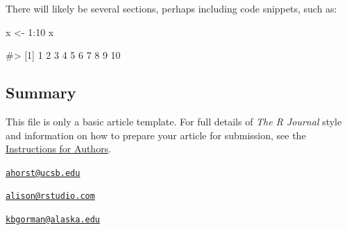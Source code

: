 There will likely be several sections, perhaps including code snippets,
such as:

\begin{Schunk}
\begin{Sinput}
x <- 1:10
x
\end{Sinput}
\begin{Soutput}
#>  [1]  1  2  3  4  5  6  7  8  9 10
\end{Soutput}
\end{Schunk}

\hypertarget{summary}{%
\subsection{Summary}\label{summary}}

This file is only a basic article template. For full details of
\emph{The R Journal} style and information on how to prepare your
article for submission, see the
\href{https://journal.r-project.org/share/author-guide.pdf}{Instructions
for Authors}.




\address{%
Allison Horst\\
Bren School of Environmental Science and Management, University of
California, Santa Barbara\\
line 1\\ line 2\\
}
\href{mailto:ahorst@ucsb.edu}{\nolinkurl{ahorst@ucsb.edu}}

\address{%
Alison Hill\\
RStudio, PBC\\
line 1\\ line 2\\
}
\href{mailto:alison@rstudio.com}{\nolinkurl{alison@rstudio.com}}

\address{%
Kristen Gorman\\
University of Alaska Fairbanks College of Fisheries and Ocean Sciences\\
line 1\\ line 2\\
}
\href{mailto:kbgorman@alaska.edu}{\nolinkurl{kbgorman@alaska.edu}}
